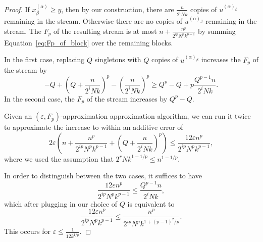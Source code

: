 \documentclass{article}
\newcommand{\eps}{\varepsilon}
\theoremstyle{plain}
\newcommand{\window}{n}
\begin{document}
\begin{proof}
If $x^{(\alpha)}_{\beta} \geq y$, then by our construction, there are $\frac{\window}{2^i Nk}$ copies of $u^{(\alpha)_{\beta}}$ remaining in the stream.  Otherwise there are no copies of $u^{(\alpha)_{\beta}}$ remaining in the stream.  The $F_p$ of the resulting stream is at most $\window + \frac{\window^p}{2^{ip} N^p k^{p-1}}$ by summing Equation~\ref{eq:Fp_of_block} over the remaining blocks. 

In the first case, replacing $Q$ singletons with $Q$ copies of $u^{(\alpha)_{\beta}}$  increases the $F_p$ of the stream by 
\[
-Q + \left(Q + \frac{\window}{2^i Nk}\right)^p - \left(\frac{\window}{2^i Nk}\right)^p
\geq Q^p - Q + p\frac{Q^{p-1}\window}{2^i N k}.
\] In the second case, the $F_p$ of the stream increases by $Q^p - Q.$

Given an $(\eps, F_p)$-approximation approximation algorithm, we can run it twice to approximate the increase to within an additive error of 
\[
2\eps \left(\window + \frac{\window^p}{2^{ip} N^p k^{p-1}} + \left(Q + \frac{\window}{2^i N k}\right)^p \right)
\leq \frac{12\eps \window^p}{2^{ip} N^p k^{p-1}},
\]
where we used the assumption that $2^r N k^{1 - 1/p} \leq \window^{1 - 1/p}.$

In order to distinguish between the two cases, it suffices to have
\[
\frac{12\eps \window^p}{2^{ip} N^p k^{p-1}} \leq \frac{Q^{p-1} \window}{2^i N k},
\]
which after plugging in our choice of $Q$ is equivalent to
\[
\frac{12\eps \window^p}{2^{ip} N^p k^{p-1}} \leq \frac{\window^p}{2^{ip} N^p k^{1 + (p-1)^2/p}}.
\] 
This occurs for $\eps \leq \frac{1}{12 k^{1/p}}.$

\end{proof}
 
\end{document}
